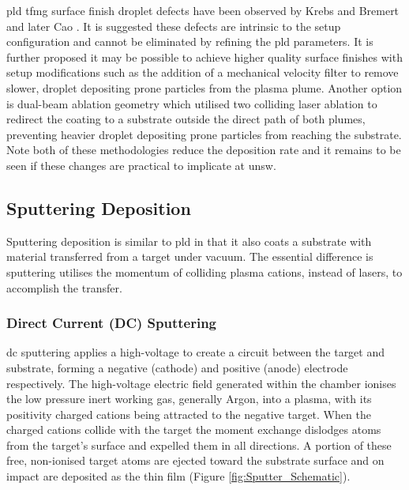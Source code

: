 \documentclass[a4paper,12pt,oneside]{report}%
\begin{document}
\Gls{pld} \gls{tfmg} surface finish droplet defects have been observed by Krebs and Bremert \cite{Krebs1993} and later Cao \cite{Cao2013}. It is suggested these defects are intrinsic to the setup configuration and cannot be eliminated by refining the \gls{pld} parameters. It is further proposed it may be possible to achieve higher quality surface finishes with setup modifications such as the addition of a mechanical velocity filter to remove slower, droplet depositing prone particles from the plasma plume. Another option is dual-beam ablation geometry which utilised two colliding laser ablation to redirect the coating to a substrate outside the direct path of both plumes, preventing heavier droplet depositing prone particles from reaching the substrate. Note both of these methodologies reduce the deposition rate and it remains to be seen if these changes are practical to implicate at \acrshort{unsw}.

\subsection{Sputtering Deposition}
Sputtering deposition is similar to \gls{pld} in that it also coats a substrate with material transferred from a target under vacuum. The essential difference is sputtering utilises the momentum of colliding plasma cations, instead of lasers, to accomplish the transfer. 

\subsubsection{Direct Current (DC) Sputtering} 
\Gls{dc} sputtering applies a high-voltage to create a circuit between the target and substrate, forming a negative (cathode) and positive (anode) electrode respectively. The high-voltage electric field generated within the chamber ionises the low pressure inert working gas, generally Argon, into a plasma, with its positivity charged cations being attracted to the negative target. When the charged cations collide with the target the moment exchange dislodges atoms from the target's surface and expelled them in all directions. A portion of these free, non-ionised target atoms are ejected toward the substrate surface and on impact are deposited as the thin film (Figure \ref{fig:Sputter_Schematic}). 
\end{document}
